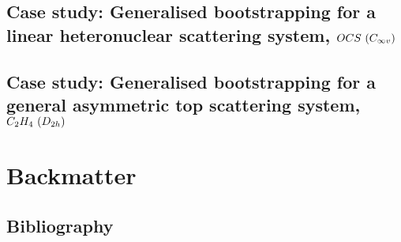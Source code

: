 \documentclass[letterpaper,table,10pt,english]{jupyterBook}
\begin{document}
\chapter{Case study: Generalised bootstrapping for a linear heteronuclear scattering system, \protect\(OCS~(C_{\infty v})\protect\)}
\label{\detokenize{part2/case-study-OCS_270423-headerOnly:case-study-generalised-bootstrapping-for-a-linear-heteronuclear-scattering-system-ocs-c-infty-v}}\label{\detokenize{part2/case-study-OCS_270423-headerOnly:chpt-ocs-case-study}}\label{\detokenize{part2/case-study-OCS_270423-headerOnly::doc}}
\sphinxstepscope


\chapter{Case study: Generalised bootstrapping for a general asymmetric top scattering system, \protect\(C_2H_4~(D_{2h})\protect\)}
\label{\detokenize{part2/case-study-C2H4_270423:case-study-generalised-bootstrapping-for-a-general-asymmetric-top-scattering-system-c-2h-4-d-2h}}\label{\detokenize{part2/case-study-C2H4_270423:chpt-c2h4-case-study}}\label{\detokenize{part2/case-study-C2H4_270423::doc}}
\sphinxstepscope


\part{Backmatter}

\sphinxstepscope


\chapter{Bibliography}
\label{\detokenize{backmatter/bibliography:bibliography}}\label{\detokenize{backmatter/bibliography::doc}}\label{\detokenize{backmatter/bibliography:id1}}
\sphinxstepscope
\end{document}
